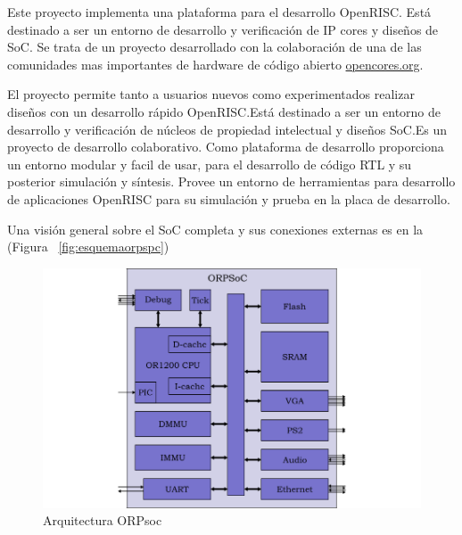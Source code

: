 				Este proyecto implementa una plataforma para el desarrollo OpenRISC. Está destinado a ser un entorno de desarrollo y verificación de IP cores y
				diseños de SoC. Se trata de un proyecto desarrollado con la colaboración de una de las comunidades mas importantes de hardware de código abierto
				\url{opencores.org}.


El proyecto permite tanto a usuarios nuevos como experimentados realizar diseños con un desarrollo rápido OpenRISC.Está destinado a ser un entorno de desarrollo y verificación de núcleos de propiedad intelectual y diseños SoC.Es un proyecto de desarrollo colaborativo. Como plataforma de desarrollo proporciona un entorno modular y facil de usar, para el desarrollo de código RTL y su posterior simulación y síntesis. Provee un entorno de herramientas para desarrollo de aplicaciones OpenRISC para su simulación y prueba en la placa de desarrollo.

Una visión general sobre el SoC completa y sus conexiones externas es en la  (Figura ~\ref{fig:esquemaorpspc})

\begin{figure}[h!]
 \begin{center}
  \includegraphics[width=1\textwidth,keepaspectratio=true]{./images/orpsoc}
  \caption{Arquitectura ORPsoc}
  \label{fig:esquemaorpsoc}
 \end{center}
\end{figure}

